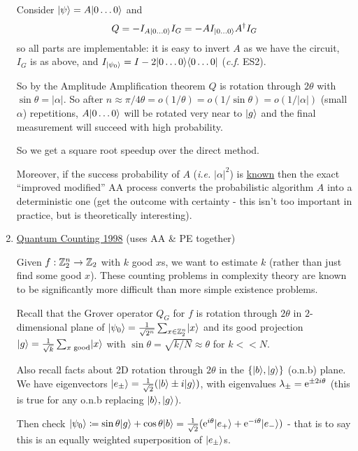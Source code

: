 \documentclass[]{article}
\begin{document}
\begin{enumerate}
	Consider $\lvert\psi\rangle = A\lvert0\dots0\rangle$ and
	\begin{align*}
		Q = -I_{A\lvert0\dots0\rangle}I_G = - AI_{\lvert0\dots0\rangle}A^\dagger I_G
	\end{align*}
	so all parts are implementable: it is easy to invert $A$ as we have the circuit, $I_G$ is as above, and $I_{\lvert\psi_0\rangle} = I - 2\lvert0\dots0\rangle\langle0\dots0\rvert$ (\textit{c.f.} ES2).

	So by the Amplitude Amplification theorem $Q$ is rotation through $2\theta$ with $\sin\theta = |\alpha|$. So after $n\approx \pi/4\theta = o(1/\theta) = o(1/\sin\theta) = o(1/|\alpha|)$ (small $\alpha$) repetitions, $A\lvert0\dots0\rangle$ will be rotated very near to $\lvert g\rangle$ and the final measurement will succeed with high probability.

	So we get a square root speedup over the direct method.

	Moreover, if the success probability of $A$ (\textit{i.e.} $|\alpha|^2$) is \underline{known} then the exact ``improved modified'' AA process converts the probabilistic algorithm $A$ into a deterministic one (get the outcome with certainty - this isn't too important in practice, but is theoretically interesting).

	\item \underline{Quantum Counting 1998} (uses AA \& PE together)

	Given $f:\mathbb{Z}_2^n\rightarrow\mathbb{Z}_2$ with $k$ good $x$s, we want to estimate $k$ (rather than just find some good $x$). These counting problems in complexity theory are known to be significantly more difficult than more simple existence problems.

	Recall that the Grover operator $Q_G$ for $f$ is rotation through $2\theta$ in $2$-dimensional plane of $\lvert\psi_0\rangle = \frac{1}{\sqrt{2^n}}\sum_{x\in\mathbb{Z}_2^n}\lvert x\rangle$ and its good projection $\lvert g\rangle = \frac{1}{\sqrt{k}}\sum_{x\textrm{ good}}\lvert x\rangle$ with $\sin\theta = \sqrt{k/N}\approx \theta$ for $k <<N$.

	Also recall facts about 2D rotation through $2\theta$ in the $\{\lvert b\rangle,\lvert g\rangle\}$ (o.n.b) plane. We have eigenvectors $\lvert e_{\pm}\rangle = \frac{1}{\sqrt{2}}(\lvert b\rangle\pm i\lvert g\rangle)$, with eigenvalues $\lambda_{\pm} = \mathrm{e}^{\pm2i\theta}$ (this is true for any o.n.b replacing $\lvert b\rangle,\lvert g\rangle$).

	Then check $\lvert\psi_0\rangle \coloneqq \sin\theta\lvert g\rangle + \cos\theta\lvert b\rangle = \frac{1}{\sqrt{2}}(\mathrm{e}^{i\theta}\lvert e_+\rangle+\mathrm{e}^{-i\theta}\lvert e_-\rangle)$ - that is to say this is an equally weighted superposition of $\lvert e_{\pm}\rangle$s.


\end{enumerate}
\end{document}
